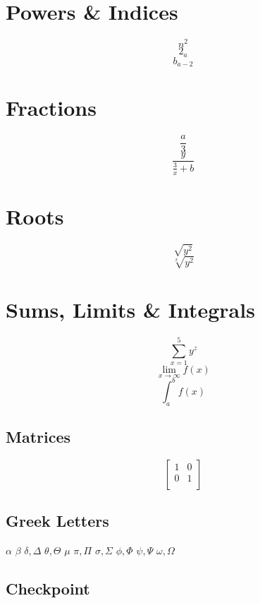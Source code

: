 \documentclass[a4paper, 12pt]{report}
\begin{document}
\section{Powers \& Indices}

$$ n^2 $$
$$ 2_a $$
$$ b_{a-2} $$

\section{Fractions}

$$ \frac{a}{3} $$
$$ \frac{y}{\frac{3}{x}+b}  $$


\section{Roots}

$$ \sqrt{y^2} $$
$$ \sqrt[x]{y^2} $$

\section{Sums, Limits \& Integrals}

$$ \sum_{x=1}^5y^z $$
$$ \lim_{x \to \infty} f(x) $$
$$ \int_a^b f(x)  $$


\subsection{Matrices}

\begin{equation*} %
	\left[
	\begin{matrix}
		1 & 0\\
		0 & 1\\
	\end{matrix}
	\right]
\end{equation*}


\subsection{Greek Letters}

$ \alpha $
$ \beta $
$\delta, \Delta$
$ \theta, \Theta $
$ \mu $
$ \pi, \Pi $
$ \sigma, \Sigma $
$ \phi, \Phi $
$ \psi, \Psi $
$ \omega, \Omega $

\subsection{Checkpoint}
\end{document}
